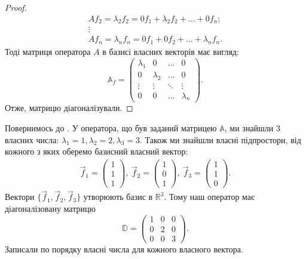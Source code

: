 \documentclass{math_library}
\begin{document}
\begin{proof}
\begin{align*}
Af_2 = \lambda_2 f_2 = 0 f_1 + \lambda_2 f_2 + \dots + 0 f_n;\\
\vdots\\
Af_n = \lambda_n f_n = 0 f_1 + 0 f_2 + \dots + \lambda_n f_n.
\end{align*}
Тоді матриця оператора $A$ в базисі власних векторів має вигляд:
\[
\mathbb{A}_f = \begin{pmatrix}
\lambda_1 & 0 & \dots & 0 \\
0 & \lambda_2 & \dots & 0 \\
\vdots & \vdots & \ddots & \vdots \\
0 & 0 & \dots & \lambda_n
\end{pmatrix}.
\]
Отже, матрицю діагоналізували.
\end{proof}

\begin{example}
Повернимось до . У оператора, що був заданий матрицею $\mathbb{A}$, ми знайшли 3 власних числа: $\lambda_1 = 1, \lambda_2 = 2,\lambda_3 = 3$. Також ми знайшли власні підпростори, від кожного з яких оберемо базисний власний вектор:
\begin{align*}
\vec{f}_1 = \begin{pmatrix}
1 \\ 1 \\ 1
\end{pmatrix},\ \vec{f}_2 = \begin{pmatrix}
1 \\ 0 \\ 1
\end{pmatrix},\ \vec{f}_3 = \begin{pmatrix}
1 \\ 1 \\ 0
\end{pmatrix}.
\end{align*}
Вектори $\{\vec{f}_1,\vec{f}_2,\vec{f}_3\}$ утворюють базис в $\mathbb{R}^3$. Тому наш оператор має діагоналізовану матрицю 
\[
\mathbb{D} = \begin{pmatrix}
1 & 0 & 0 \\
0 & 2 & 0 \\
0 & 0 & 3
\end{pmatrix}.
\]
Записали по порядку власні числа для кожного власного вектора.
\end{example}
\end{document}
